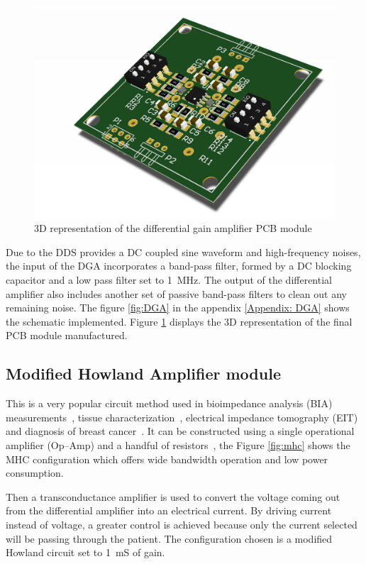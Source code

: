 \begin{figure}[!htpb]
	\centering
	\includegraphics[width=7.5 cm,keepaspectratio]{figure_DGA}
	\caption{3D representation of the differential gain amplifier PCB module}
	\label{fig:3D DGA}
\end{figure}

Due to the DDS provides a DC coupled sine waveform and high-frequency noises, the input of the DGA incorporates a band-pass filter, formed by a DC blocking capacitor and a low pass filter set to \SI{1}{\mega\hertz}. The output of the differential amplifier also includes another set of passive band-pass filters to clean out any remaining noise. The figure \ref{fig:DGA} in the appendix \ref{Appendix: DGA} shows the schematic implemented. Figure \ref{fig:3D DGA} displays the 3D representation of the final PCB module manufactured.

\subsection{Modified Howland Amplifier module}
\label{section MHC}
This is a very popular circuit method used in bioimpedance analysis (BIA) measurements~\cite{aroom2009bioimpedance}, tissue characterization~\cite{bertemes2002tissue,ross2003current}, electrical impedance tomography (EIT) and diagnosis of breast cancer~\cite{zou2003review,saulnier2007electrical}. It can be constructed using a single operational amplifier (Op–Amp) and a handful of resistors~\cite{sheingold1964impedance}, the Figure \ref{fig:mhc} shows the MHC configuration which offers wide bandwidth operation and low power consumption. 

Then a transconductance amplifier is used to convert the voltage coming out from the differential amplifier into an electrical current. By driving current instead of voltage, a greater control is achieved because only the current selected will be passing through the patient. The configuration chosen is a modified Howland circuit set to \SI{1}{\milli\siemens} of gain.

